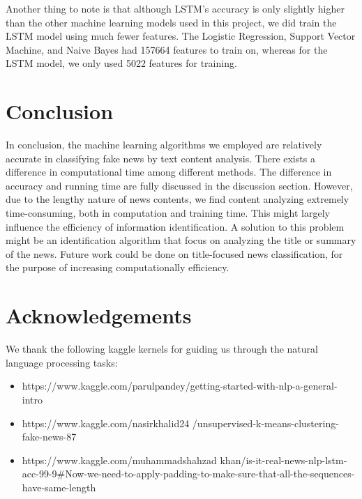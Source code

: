 \documentclass{article}
\begin{document}
\begin{multicols}{2}
Another thing to note is that although LSTM's accuracy is only slightly higher than the other machine learning models used in this project, we did train the LSTM model using much fewer features. The Logistic Regression, Support Vector Machine, and Naive Bayes had 157664 features to train on, whereas for the LSTM model, we only used 5022 features for training.





\section{Conclusion}
In conclusion, the machine learning algorithms we employed are relatively accurate in classifying fake news by text content analysis. There exists a difference in computational time among different methods. The difference in accuracy and running time are fully discussed in the discussion section. However, due to the lengthy nature of news contents, we find content analyzing extremely time-consuming, both in computation and training time. This might largely influence the efficiency of information identification. A solution to this problem might be an identification algorithm that focus on analyzing the title or summary of the news. Future work could be done on title-focused news classification, for the purpose of increasing computationally efficiency.



\section{Acknowledgements}

We thank the following kaggle kernels for guiding us through the natural language processing tasks:
\begin{itemize}
    \item https://www.kaggle.com/parulpandey/getting-started-with-nlp-a-general-intro
    \item https://www.kaggle.com/nasirkhalid24 /unsupervised-k-means-clustering-fake-news-87
    \item https://www.kaggle.com/muhammadshahzad
    khan/is-it-real-news-nlp-lstm-acc-99-9#Now-we-need-to-apply-padding-to-make-sure-that-all-the-sequences-have-same-length
\end{itemize}


\newpage
\begin{thebibliography}{9}


\end{thebibliography}
\end{multicols}
\end{document}
